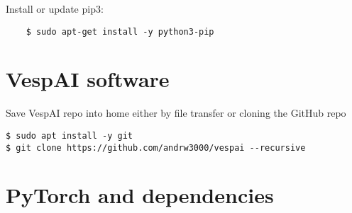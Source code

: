 \documentclass[12pt, a4paper, oneside]{article}
\begin{document}
Install or update pip3:
\begin{verbatim}
	$ sudo apt-get install -y python3-pip 
\end{verbatim}

\section{VespAI software}
Save VespAI repo into home either by file transfer or cloning the GitHub repo
\begin{verbatim}
$ sudo apt install -y git
$ git clone https://github.com/andrw3000/vespai --recursive
\end{verbatim}


\section{PyTorch and dependencies}
\end{document}
